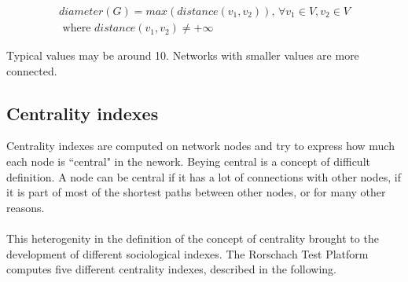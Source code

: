 \begin{itemize}
\begin{equation}
\begin{split}
diameter(G) = max\left ( distance(v_{1}, v_{2}) \right )
\textrm {, } \forall v_{1} \in V, v_{2} \in V \\
\textrm{ where }
distance(v_{1}, v_{2}) \neq  +\infty
\end{split}
\label{eq:diameter}
\end{equation}

Typical values may be around 10. Networks with smaller values are more connected.
\end{itemize}

\label{centralityindexes}
\subsection{Centrality indexes}
Centrality indexes are computed on network nodes and try to express how much each node is ``central" in the nework.
Beying central is a concept of difficult definition.
A node can be central if it has a lot of connections with other nodes, if it is part of most of the shortest paths between other nodes, or for many other reasons.\\
\\
This heterogenity in the definition of the concept of centrality brought to the development of different sociological indexes.
The Rorschach Test Platform computes five different centrality indexes, described in the following.

